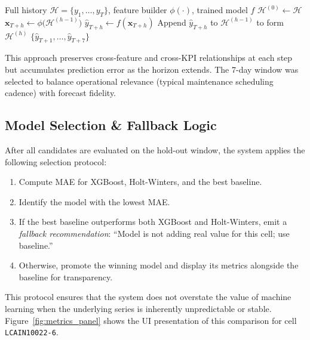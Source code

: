 \begin{algorithm}[H]
    \caption{Recursive 7-Day Ahead Forecast}
    \label{alg:recursive}
    \begin{algorithmic}[1]
        \Require Full history $\mathcal{H} = \{y_1, \ldots, y_T\}$, feature builder $\phi(\cdot)$, trained model $f$
        \State $\mathcal{H}^{(0)} \gets \mathcal{H}$
            \State $\mathbf{x}_{T+h} \gets \phi\bigl(\mathcal{H}^{(h-1)}\bigr)$
            \State $\hat{y}_{T+h} \gets f(\mathbf{x}_{T+h})$
            \State Append $\hat{y}_{T+h}$ to $\mathcal{H}^{(h-1)}$ to form $\mathcal{H}^{(h)}$
        \EndFor
        \State \Return $\{\hat{y}_{T+1}, \ldots, \hat{y}_{T+7}\}$
    \end{algorithmic}
\end{algorithm}

This approach preserves cross-feature and cross-KPI relationships at each step but accumulates prediction error as the horizon extends. The 7-day window was selected to balance operational relevance (typical maintenance scheduling cadence) with forecast fidelity.

\subsection{Model Selection \& Fallback Logic}

After all candidates are evaluated on the hold-out window, the system applies the following selection protocol:

\begin{enumerate}
    \item Compute MAE for XGBoost, Holt-Winters, and the best baseline.
    \item Identify the model with the lowest MAE.
    \item If the best baseline outperforms both XGBoost and Holt-Winters, emit a \emph{fallback recommendation}: ``Model is not adding real value for this cell; use baseline.''
    \item Otherwise, promote the winning model and display its metrics alongside the baseline for transparency.
\end{enumerate}

This protocol ensures that the system does not overstate the value of machine learning when the underlying series is inherently unpredictable or stable. Figure~\ref{fig:metrics_panel} shows the UI presentation of this comparison for cell \texttt{LCAIN10022-6}.

